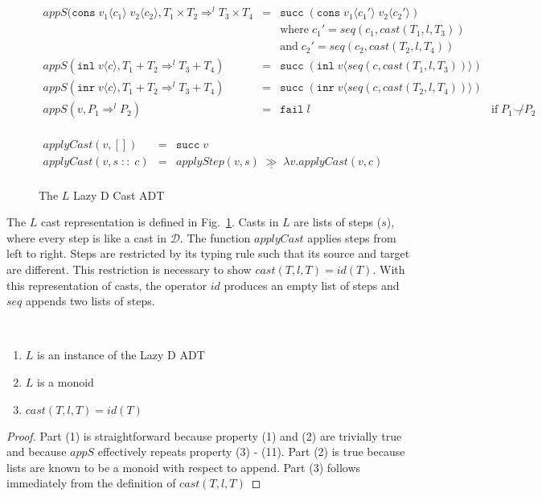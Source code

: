 \documentclass[acmsmall,review]{acmart}\settopmatter{printfolios=true,printccs=false,printacmref=false}
\newcommand{\mbind}{\ensuremath{\;\underline{\gg}\;}}
\newcommand{\figref}[1]{Fig.~\ref{#1}}
\newcommand{\funrule}[3]{#1 &=& #2 & #3\\}
\newcommand{\plus}[0]{+}
\newcommand{\POOprod}[2]{#1 \times #2}
\newcommand{\POOsum}[2]{#1 \plus #2}
\newcommand{\cOOcast}[3]{#1 \Rightarrow^{#2} #3}
\newcommand{\rOOsucc}[1]{\mathtt{succ}\;#1}
\newcommand{\rOOfail}[1]{\mathtt{fail}\;#1}
\newcommand{\hcvOOcons}[4]{\mathtt{cons}\;#1\langle#2\rangle\;#3\langle#4\rangle}
\newcommand{\hcvOOinl}[2]{\mathtt{inl}\;#1\langle#2\rangle}
\newcommand{\hcvOOinr}[2]{\mathtt{inr}\;#1\langle#2\rangle}
\newcommand{\sidecond}[1]{\text{if}\;#1}
\newcommand{\ineffCEKD}{\ensuremath{\mathcal{D}}}
\newcommand{\lsOOcast}[3]{\cOOcast{#1}{#2}{#3}}
\newcommand{\lcOOnull}[0]{[]}
\newcommand{\lcOOcons}[2]{#1 \; :: \; #2}
\begin{document}
\begin{figure}
\[\begin{array}{rclr}
\funrule{
  appS(
    \hcvOOcons{v_1}{c_1}{v_2}{c_2},
    \lsOOcast{\POOprod{T_1}{T_2}}{l}{\POOprod{T_3}{T_4}}
}{
  \rOOsucc{(\hcvOOcons{v_1}{c_1'}{v_2}{c_2'})}
}{
\\ &&
\text{where} \;
c_1' = seq(c_1,cast(T_1,l,T_3))
\\ &&
\text{and} \;
c_2' = seq(c_2,cast(T_2,l,T_4))
}
\funrule{
  appS(\hcvOOinl{v}{c},\lsOOcast{\POOsum{T_1}{T_2}}{l}{\POOsum{T_3}{T_4}})
}{
  \rOOsucc{(\hcvOOinl{v}{seq(c,cast(T_1,l,T_3))})}
}{}
\funrule{
  appS(\hcvOOinr{v}{c},\lsOOcast{\POOsum{T_1}{T_2}}{l}{\POOsum{T_3}{T_4}})
}{
  \rOOsucc{(\hcvOOinr{v}{seq(c,cast(T_2,l,T_4))})}
}{}
\funrule{
  appS(v,\cOOcast{P_1}{l}{P_2})
}{
  \rOOfail{l}
}{\sidecond{P_1 \not\smile P_2}}

\end{array}
\]


\[
\begin{array}{rclr}
\funrule{
  applyCast(v,\lcOOnull)
}{
  \rOOsucc{v}
}{}
\funrule{
  applyCast(v,\lcOOcons{s}{c})
}{
  applyStep(v,s) \mbind{} \lambda v. applyCast(v,c)
}{}
\end{array}
\]

\caption{The $L$ Lazy D Cast ADT}
\label{fig:L-instance-LazyD}
\end{figure}

The $L$ cast representation is defined in \figref{fig:L-instance-LazyD}.
Casts in $L$ are lists of steps ($s$), where every step is like a cast in 
\ineffCEKD. The function $applyCast$ applies steps from left to right. Steps are 
restricted by its typing rule such that its source and target are different. This 
restriction is necessary to show $cast(T,l,T) = id(T)$. With this representation
of casts, the operator $id$ produces an empty list of steps
and $seq$ appends two lists of steps. 

\begin{proposition}[$L$ Properties]\label{thm:L-LazyD-monoid}\ 
  \begin{enumerate}
  \item $L$ is an instance of the Lazy D ADT
  \item $L$ is a monoid
  \item $cast(T,l,T) = id(T)$
  \end{enumerate}
\end{proposition}
\begin{proof}
  Part (1) is straightforward because property (1) and (2) are 
  trivially true and because $appS$ effectively repeats property (3) - 
  (11).
  Part (2) is true because lists are known to be a monoid with respect to append.
  Part (3) follows immediately from the definition of $cast(T,l,T)$
\end{proof}
\end{document}

